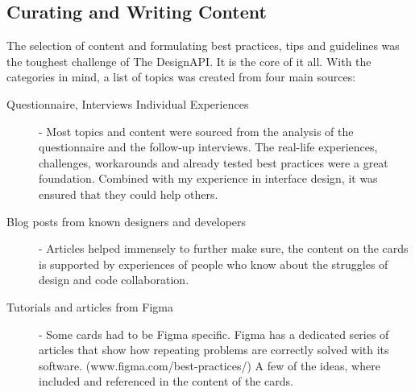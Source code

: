 \newpage
\subsection{Curating and Writing Content}
The selection of content and formulating best practices, tips and guidelines was the toughest
challenge of The DesignAPI. It is the core of it all. With the categories in mind, a list of topics
was created from four main sources:

\begin{description}
      \item[Questionnaire, Interviews Individual Experiences] - Most topics and content were sourced
            from the analysis of the questionnaire and the follow-up interviews. The real-life
            experiences, challenges, workarounds and already tested best practices were a great
            foundation. Combined with my experience in interface design, it was ensured that they
            could help others.
      \item[Blog posts from known designers and developers] - Articles helped immensely to further
            make sure, the content on the cards is supported by experiences of people who know about
            the struggles of design and code collaboration.
      \item[Tutorials and articles from Figma] - Some cards had to be Figma specific. Figma has a
            dedicated series of articles that show how repeating problems are correctly solved with
            its software. (www.figma.com/best-practices/) A few of the ideas, where included and
            referenced in the content of the cards.
\end{description}


% 

